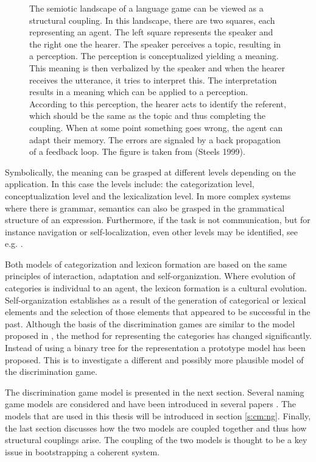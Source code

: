 \begin{figure}
\caption{The semiotic landscape of a language game can be viewed as a structural coupling. In this landscape, there are two squares, each representing an agent. The left square represents the speaker and the right one the hearer. The speaker perceives a topic, resulting in a perception. The perception is conceptualized yielding a meaning. This meaning is then verbalized by the speaker and when the hearer receives the utterance, it tries to interpret this. The interpretation results in a meaning which can be applied to a perception. According to this perception, the hearer acts to identify the referent, which should be the same as the topic and thus completing the coupling. When at some point something goes wrong, the agent can adapt their memory. The errors are signaled by a back propagation of a feedback loop. The figure is taken from (Steels 1999).}
\label{f:cm:semiotic}
\end{figure}

Symbolically, the meaning can be grasped at different levels depending on the application. In this case the levels include: the categorization level, conceptualization level and the lexicalization level. In more complex systems where there is grammar, semantics can also be grasped in the grammatical structure of an expression. Furthermore, if the task is not communication, but for instance navigation or self-localization, even other levels may be identified, see e.g. \cite{KroBunVlaMot99,taninolfi:1998}.

Both models of categorization and lexicon formation are based on the same principles of interaction, adaptation and self-organization. Where evolution of categories is individual to an agent, the lexicon formation is a cultural evolution. Self-organization establishes as a result of the generation of categorical or lexical elements and the selection of those elements that appeared to be successful in the past. Although the basis of the discrimination games are similar to the model proposed in \cite{steels:1996b}, the method for representing the categories has changed significantly. Instead of using a binary tree for the representation a prototype model has been proposed. This is to investigate a different and possibly more plausible model of the discrimination game. 

\p
The discrimination game model is presented in the next section. Several naming game models are considered and have been introduced in several papers \cite{steels:1996a,steelskaplan:1998,vogt:1998c}. The models that are used in this thesis will be introduced in section \ref{s:cm:ng}. Finally, the last section discusses how the two models are coupled together and thus how structural couplings arise. The coupling of the two models is thought to be a key issue in bootstrapping a coherent system.

